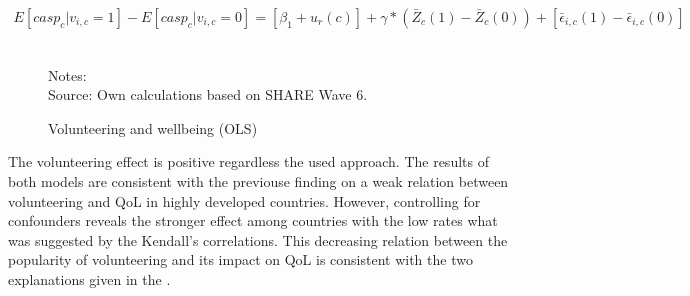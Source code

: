\documentclass[10pt, letterpaper]{article}
\begin{document}
\begin{spacing}{1.4}
 \begin{eqnarray}
 \label{eq:decomp_mlm}
E[casp_{c}|v_{i,c}=1]-E[casp_{c}|v_{i,c}=0]= [\beta_{1}+u_{r}(c)]+ \gamma*(\bar{Z}_{c}(1)-\bar{Z}_{c}(0))+ [\bar{\epsilon}_{i,c}(1)-\bar{\epsilon}_{i,c}(0)]
 \end{eqnarray}

\begin{figure}[H]
\centering
\caption{Volunteering and wellbeing (OLS)} 
\label{fig:casp_ols}
\begin{minipage}{1\linewidth}
\quad
{}~\\ 
{\footnotesize Notes: }~\\
{\footnotesize Source: Own calculations based on SHARE Wave 6.}
\end{minipage}
\end{figure} 

The volunteering effect is positive regardless the used approach. The results of both models are consistent with the previouse finding on a weak relation between volunteering and QoL in highly developed countries. However, controlling for confounders reveals the stronger effect among countries with the low rates what was suggested by the Kendall's correlations. This decreasing relation between the popularity of volunteering and its impact on QoL is consistent with the two explanations given in the \citet{haski09}.     \\


\end{spacing}
\end{document}
